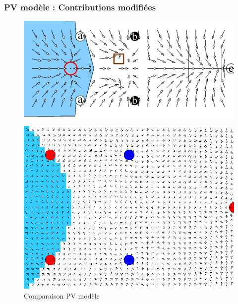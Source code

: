 \documentclass{beamer}
\begin{document}
\begin{frame}
  \frametitle{PV modèle : Contributions modifiées}
  \begin{figure}
    \centering
    \includegraphics[scale=0.3]{pv_article.png}
  \end{figure}
  \begin{figure}
    \centering
    \includegraphics[scale=0.15]{pv2_res.png}
    \caption{Comparaison PV modèle}
  \end{figure}  
\end{frame}
\end{document}
